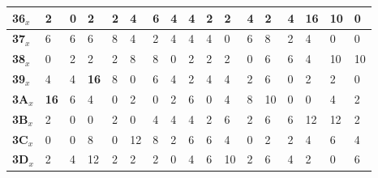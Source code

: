 \begin{longtable}[c]{|l|l|l|l|l|l|l|l|l|l|l|l|l|l|l|l|l|}
\textbf{36$_x$} & 2              & 0              & 2              & 2              & 4              & 6              & 4              & 4              & 2              & 2              & 4              & 2              & 4              & \textbf{16}             & 10             & 0              \\ \hline
\textbf{37$_x$} & 6              & 6              & 6              & 8              & 4              & 2              & 4              & 4              & 4              & 0              & 6              & 8              & 2              & 4              & 0              & 0              \\ \hline
\textbf{38$_x$} & 0              & 2              & 2              & 2              & 8              & 8              & 0              & 2              & 2              & 2              & 0              & 6              & 6              & 4              & 10             & 10             \\ \hline
\textbf{39$_x$} & 4              & 4              & \textbf{16}             & 8              & 0              & 6              & 4              & 2              & 4              & 4              & 2              & 6              & 0              & 2              & 2              & 0              \\ \hline
\textbf{3A$_x$} & \textbf{16}             & 6              & 4              & 0              & 2              & 0              & 2              & 6              & 0              & 4              & 8              & 10             & 0              & 0              & 4              & 2              \\ \hline
\textbf{3B$_x$} & 2              & 0              & 0              & 2              & 0              & 4              & 4              & 4              & 2              & 6              & 2              & 6              & 6              & 12             & 12             & 2              \\ \hline
\textbf{3C$_x$} & 0              & 0              & 8              & 0              & 12             & 8              & 2              & 6              & 6              & 4              & 0              & 2              & 2              & 4              & 6              & 4              \\ \hline
\textbf{3D$_x$} & 2              & 4              & 12             & 2              & 2              & 2              & 0              & 4              & 6              & 10             & 2              & 6              & 4              & 2              & 0              & 6              \\ \hline

\end{longtable}

